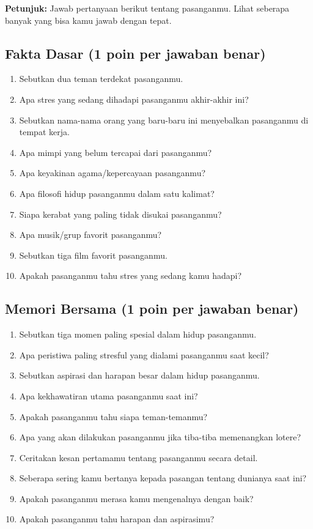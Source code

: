 \begin{exercisebox}
\textbf{Petunjuk:} Jawab pertanyaan berikut tentang pasanganmu. Lihat seberapa banyak yang bisa kamu jawab dengan tepat.

\subsection*{Fakta Dasar (1 poin per jawaban benar)}
\begin{enumerate}
    \item Sebutkan dua teman terdekat pasanganmu.
    \item Apa stres yang sedang dihadapi pasanganmu akhir-akhir ini?
    \item Sebutkan nama-nama orang yang baru-baru ini menyebalkan pasanganmu di tempat kerja.
    \item Apa mimpi yang belum tercapai dari pasanganmu?
    \item Apa keyakinan agama/kepercayaan pasanganmu?
    \item Apa filosofi hidup pasanganmu dalam satu kalimat?
    \item Siapa kerabat yang paling tidak disukai pasanganmu?
    \item Apa musik/grup favorit pasanganmu?
    \item Sebutkan tiga film favorit pasanganmu.
    \item Apakah pasanganmu tahu stres yang sedang kamu hadapi?
\end{enumerate}

\subsection*{Memori Bersama (1 poin per jawaban benar)}
\begin{enumerate}
    \item[11.] Sebutkan tiga momen paling spesial dalam hidup pasanganmu.
    \item[12.] Apa peristiwa paling stresful yang dialami pasanganmu saat kecil?
    \item[13.] Sebutkan aspirasi dan harapan besar dalam hidup pasanganmu.
    \item[14.] Apa kekhawatiran utama pasanganmu saat ini?
    \item[15.] Apakah pasanganmu tahu siapa teman-temanmu?
    \item[16.] Apa yang akan dilakukan pasanganmu jika tiba-tiba memenangkan lotere?
    \item[17.] Ceritakan kesan pertamamu tentang pasanganmu secara detail.
    \item[18.] Seberapa sering kamu bertanya kepada pasangan tentang dunianya saat ini?
    \item[19.] Apakah pasanganmu merasa kamu mengenalnya dengan baik?
    \item[20.] Apakah pasanganmu tahu harapan dan aspirasimu?
\end{enumerate}


\end{exercisebox}
